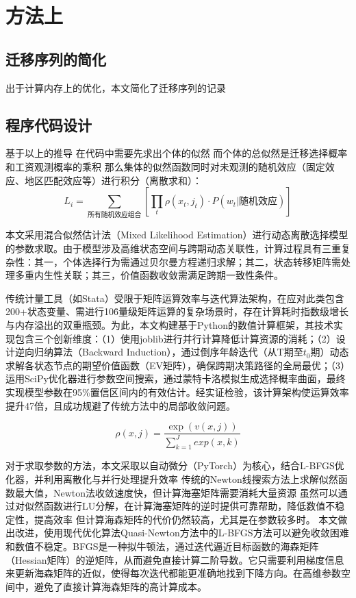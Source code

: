 \documentclass[a4paper,12pt,oneside]{book} %
\begin{document}
\section{方法上} %
\label{sub:方法上}


\subsection{迁移序列的简化}

出于计算内存上的优化，本文简化了迁移序列的记录

\subsection{程序代码设计}
基于以上的推导
在代码中需要先求出个体的似然
而个体的总似然是迁移选择概率和工资观测概率的乘积
那么集体的似然函数同时对未观测的随机效应（固定效应、地区匹配效应等）进行积分（离散求和）：
\begin{equation}
  L_{i}=\sum\limits_{\text{所有随机效应组合}}[\prod_{t}\rho(x_{t},j_{t})⋅P(w_{t}|\text{随机效应}) ]
\end{equation}

本文采用混合似然估计法（Mixed Likelihood Estimation）进行动态离散选择模型的参数求取。由于模型涉及高维状态空间与跨期动态关联性，计算过程具有三重复杂性：其一，个体选择行为需通过贝尔曼方程递归求解；其二，状态转移矩阵需处理多重内生性关联；其三，价值函数收敛需满足跨期一致性条件。

传统计量工具（如Stata）受限于矩阵运算效率与迭代算法架构，在应对此类包含200+状态变量、需进行10\^6量级矩阵运算的复杂场景时，存在计算耗时指数级增长与内存溢出的双重瓶颈。为此，本文构建基于Python的数值计算框架，其技术实现包含三个创新维度：（1）使用joblib进行并行计算降低计算资源的消耗；（2）设计逆向归纳算法（Backward Induction），通过倒序年龄迭代（从T期至$t_0$期）动态求解各状态节点的期望价值函数（EV矩阵），确保跨期决策路径的全局最优；（3）运用SciPy优化器进行参数空间搜索，通过蒙特卡洛模拟生成选择概率曲面，最终实现模型参数在95\%置信区间内的有效估计。经实证检验，该计算架构使运算效率提升47倍，且成功规避了传统方法中的局部收敛问题。

\begin{equation}
  \rho(x,j)=\frac{\exp(v(x,j))}{\sum\limits_{k=1}^{J} exp(x,k)}
\end{equation}

对于求取参数的方法，本文采取以自动微分（PyTorch）为核心，结合L-BFGS优化器，并利用离散化与并行处理提升效率
传统的Newton线搜索方法上求解似然函数最大值，Newton法收敛速度快，但计算海塞矩阵需要消耗大量资源
虽然可以通过对似然函数进行LU分解，在计算海塞矩阵的逆时提供可靠帮助，降低数值不稳定性，提高效率
但计算海森矩阵的代价仍然较高，尤其是在参数较多时。
本文做出改进，使用现代优化算法Quasi-Newton方法中的L-BFGS方法可以避免收敛困难和数值不稳定。BFGS是一种拟牛顿法，通过迭代逼近目标函数的海森矩阵（Hessian矩阵）的逆矩阵，从而避免直接计算二阶导数。它只需要利用梯度信息来更新海森矩阵的近似，使得每次迭代都能更准确地找到下降方向。在高维参数空间中，避免了直接计算海森矩阵的高计算成本。
\end{document}
